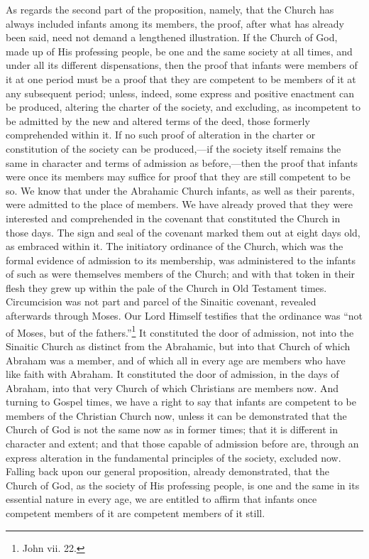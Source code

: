 \documentclass[]{book}
\begin{document}
As regards the second part of the proposition, namely, that the Church has always included infants among its members, the proof, after what has already been said, need not demand a lengthened illustration. If the Church of God, made up of His professing people, be one and the same society at all times, and under all its different dispensations, then the proof that infants were members of it at one period must be a proof that they are competent to be members of it at any subsequent period; unless, indeed, some express and positive enactment can be produced, altering the charter of the society, and excluding, as incompetent to be admitted by the new and altered terms of the deed, those formerly comprehended within it. If no such proof of alteration in the charter or constitution of the society can be produced,---if the society itself remains the same in character and terms of admission as before,---then the proof that infants were once its members may suffice for proof that they are still competent to be so. We know that under the Abrahamic Church infants, as well as their parents, were admitted to the place of members. We have already proved that they were interested and comprehended in the covenant that constituted the Church in those days. The sign and seal of the covenant marked them out at eight days old, as embraced within it. The initiatory ordinance of the Church, which was the formal evidence of admission to its membership, was administered to the infants of such as were themselves members of the Church; and with that token in their flesh they grew up within the pale of the Church in Old Testament times. Circumcision was not part and parcel of the Sinaitic covenant, revealed afterwards through Moses. Our Lord Himself testifies that the ordinance was ``not of Moses, but of the fathers.''\footnote{John vii. 22.} It constituted the door of admission, not into the Sinaitic Church as distinct from the Abrahamic, but into that Church of which Abraham was a member, and of which all in every age are members who have like faith with Abraham. It constituted the door of admission, in the days of Abraham, into that very Church of which Christians are members now. And turning to Gospel times, we have a right to say that infants are competent to be members of the Christian Church now, unless it can be demonstrated that the Church of God is not the same now as in former times; that it is different in character and extent; and that those capable of admission before are, through an express alteration in the fundamental principles of the society, excluded now. Falling back upon our general proposition, already demonstrated, that the Church of God, as the society of His professing people, is one and the same in its essential nature in every age, we are entitled to affirm that infants once competent members of it are competent members of it still.
\end{document}
